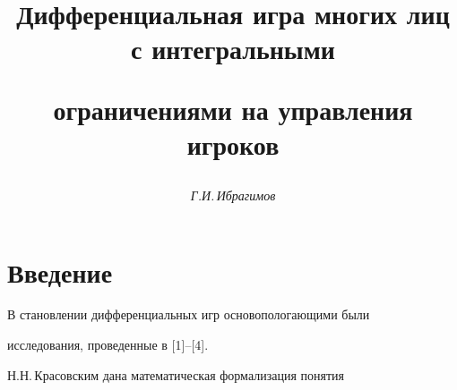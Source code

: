 

\setcounter{page}{48}

















\author{\it Г.И.\,Ибрагимов}




\title{Дифференциальная игра многих лиц с интегральными


ограничениями на управления игроков}





\date{}




\pagestyle{plain} %







\maketitle


\label{begin}











\section{Введение}





В становлении дифференциальных игр основопологающими были


исследования, проведенные в [1]--[4].





Н.Н.\,Красовским дана математическая формализация понятия


